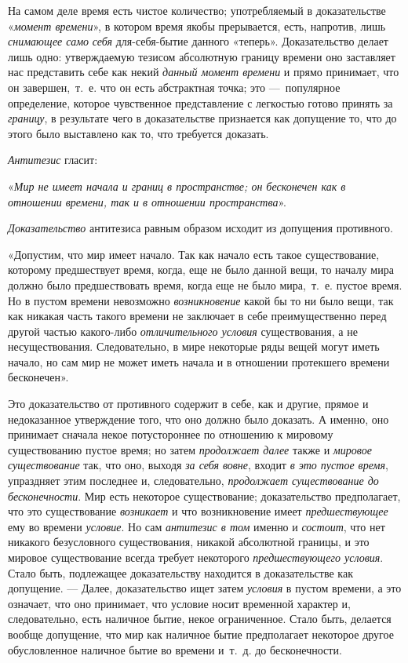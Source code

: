 {На самом деле время есть чистое количество; употребляемый в доказательстве
«{\em момент времени}», в котором время якобы
прерывается, есть, напротив, лишь {\em снимающее само}
{\em себя} для-себя-бытие данного «теперь».
Доказательство делает лишь одно: утверждаемую тезисом абсолютную границу
времени оно заставляет нас представить себе как некий
{\em данный момент времени} и прямо принимает, что он
завершен,~т.~е. что он есть абстрактная точка; это —~популярное
определение, которое чувственное представление с легкостью готово принять
за {\em границу}, в результате чего в доказательстве
признается как допущение то, что до этого было выставлено как то, что
требуется доказать.

{\em Антитезис} гласит:

«{\em Мир не имеет начала и границ в пространстве; он
бесконечен как в отношении времени, так и в отношении пространства}».

{\em Доказательство} антитезиса равным образом исходит
из допущения противного.

«Допустим, что мир имеет начало. Так как начало есть такое существование,
которому предшествует время, когда, еще не было данной вещи, то началу мира
должно было предшествовать время, когда еще не было мира,~т.~е. пустое
время. Но в пустом времени невозможно
{\em возникновение} какой бы то ни было вещи, так как
никакая часть такого времени не заключает в себе преимущественно перед
другой частью какого-либо {\em отличительного условия}
существования, а не несуществования. Следовательно, в мире некоторые ряды
вещей могут иметь начало, но сам мир не может иметь начала и в отношении
протекшего времени бесконечен».

Это доказательство от противного содержит в себе, как и другие, прямое и
недоказанное утверждение того, что оно должно было доказать. А именно, оно
принимает сначала некое потустороннее по отношению к мировому существованию
пустое время; но затем {\em продолжает далее} также и
{\em мировое существование} так, что оно, выходя
{\em за себя вовне}, входит {\em в
это пустое время}, упраздняет этим последнее и, следовательно,
{\em продолжает существование до бесконечности}. Мир
есть некоторое существование; доказательство предполагает, что это
существование {\em возникает} и что возникновение имеет
{\em предшествующее} ему во времени
{\em условие}. Но сам
{\em антитезис в том} именно и
{\em состоит}, что нет никакого безусловного
существования, никакой абсолютной границы, и это мировое существование
всегда требует некоторого {\em предшествующего
условия}. Стало быть, подлежащее доказательству находится в доказательстве
как допущение. — Далее, доказательство ищет затем
{\em условия} в пустом времени, а это означает, что оно
принимает, что условие носит временной характер и, следовательно, есть
наличное бытие, некое ограниченное. Стало быть, делается вообще допущение,
что мир как наличное бытие предполагает некоторое другое обусловленное
наличное бытие во времени и~т.~д. до бесконечности.

}
